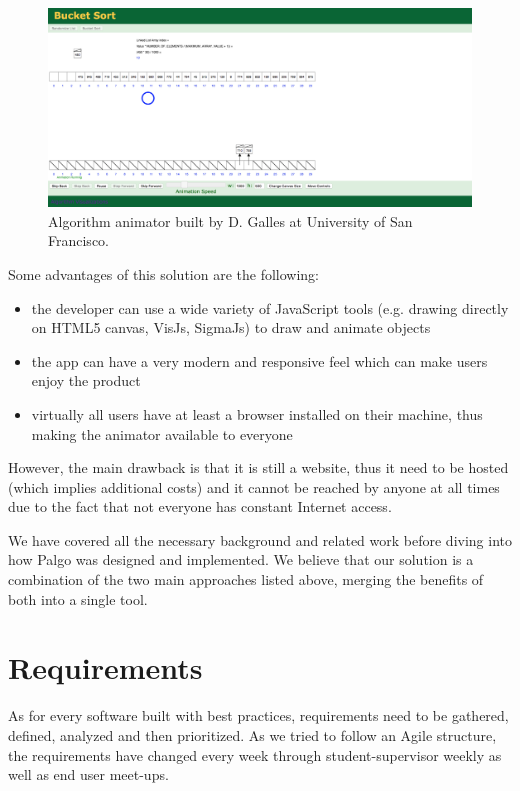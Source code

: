 \documentclass{l4proj}
\begin{document}
\begin{figure}[!ht]
\centering
\includegraphics[scale=0.25]{galles}
\caption{Algorithm animator built by D. Galles at University of San Francisco.}
\label{fig:galles}
\end{figure}

Some advantages of this solution are the following:
\begin{itemize}
\item the developer can use a wide variety of JavaScript tools (e.g. drawing directly on HTML5 canvas, VisJs, SigmaJs) to draw and animate objects
\item the app can have a very modern and responsive feel which can make users enjoy the product
\item virtually all users have at least a browser installed on their machine, thus making the animator available to everyone
\end{itemize}

However, the main drawback is that it is still a website, thus it need to be hosted (which implies additional costs) and it cannot be reached by anyone at all times due to the fact that not everyone has constant Internet access.

We have covered all the necessary background and related work before diving into how Palgo was designed and implemented. We believe that our solution is a combination of the two main approaches listed above, merging the benefits of both into a single tool.


\chapter{Requirements}
\label{requirements}

As for every software built with best practices, requirements need to be gathered, defined, analyzed and then prioritized. As we tried to follow an Agile structure, the requirements have changed every week through student-supervisor weekly as well as end user meet-ups.
\end{document}
